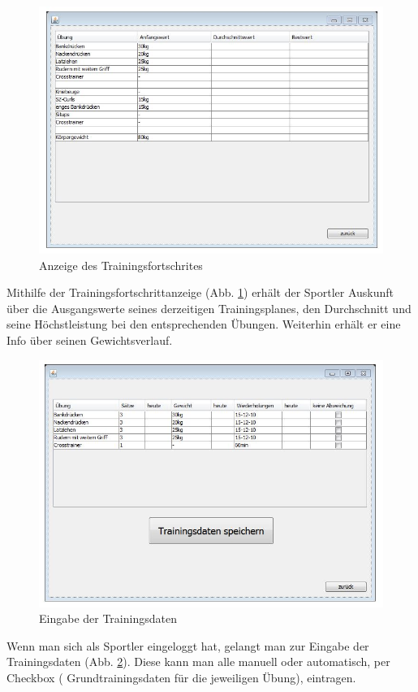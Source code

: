 \documentclass[a4paper,12pt]{article}
\begin{document}
\begin{figure}[H]
\begin{center}
 \includegraphics[width=0.75\hsize]{./fortschritt.jpg}
 \end{center}
\caption[Anzeige des Trainingsfortschrites]{\label{fortschritt}Anzeige des Trainingsfortschrites}
\end{figure}
Mithilfe der Trainingsfortschrittanzeige (Abb. \ref{fortschritt}) erhält der Sportler Auskunft über die Ausgangswerte seines derzeitigen Trainingsplanes, den Durchschnitt und seine Höchstleistung bei den entsprechenden Übungen. Weiterhin erhält er eine Info über seinen Gewichtsverlauf.
\begin{figure}[H]
\begin{center}
 \includegraphics[width=0.75\hsize]{./sportlerView.jpg}
 \end{center}
\caption[Eingabe der Trainingsdaten]{\label{sportlerView}Eingabe der Trainingsdaten}
\end{figure}
Wenn man sich als Sportler eingeloggt hat, gelangt man zur Eingabe der Trainingsdaten (Abb. \ref{sportlerView}). Diese kann man alle manuell oder automatisch, per Checkbox ( Grundtrainingsdaten für die jeweiligen Übung), eintragen.
\end{document}
